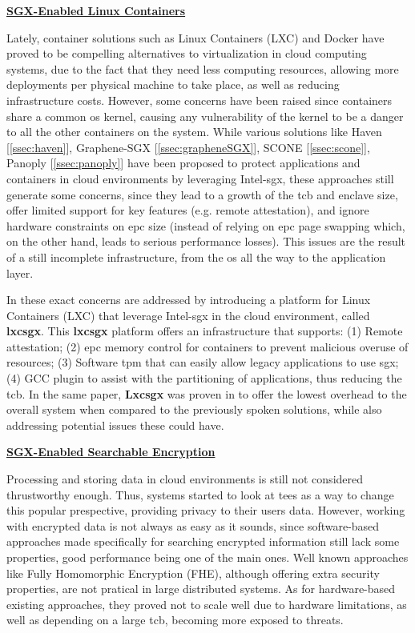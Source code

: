 \underline{\textbf{SGX-Enabled Linux Containers}}


Lately, container solutions such as Linux Containers (LXC) and Docker have proved to be compelling alternatives to virtualization in cloud computing systems, due to the fact that they need less computing resources, allowing more deployments per physical machine to take place, as well as reducing infrastructure costs. However, some concerns have been raised since containers share a common \gls{os} kernel, causing any vulnerability of the kernel to be a danger to all the other containers on the system.
While various solutions like Haven [\ref{ssec:haven}], Graphene-SGX [\ref{ssec:grapheneSGX}], SCONE [\ref{ssec:scone}], Panoply [\ref{ssec:panoply}] have been proposed to protect applications and containers in cloud environments by leveraging Intel-\gls{sgx}, these approaches still generate some concerns, since they lead to a growth of the \gls{tcb} and enclave size, offer limited support for key features (e.g. remote attestation), and ignore hardware constraints on \gls{epc} size (instead of relying on \gls{epc} page swapping which, on the other hand, leads to serious performance losses). 
This issues are the result of a still incomplete infrastructure, from the \gls{os} all the way to the application layer. 

In \cite{lxcsgxPaper} these exact concerns are addressed by introducing a platform for Linux Containers (LXC) that leverage Intel-\gls{sgx} in the cloud environment, called \textbf{lxcsgx}. 
This \textbf{lxcsgx} platform offers an infrastructure that supports: (1) Remote attestation; (2) \gls{epc} memory control for containers to prevent malicious overuse of resources; (3) Software \gls{tpm} that can easily allow legacy applications to use \gls{sgx}; (4) GCC plugin to assist with the partitioning of applications, thus reducing the \gls{tcb}.
In the same paper, \textbf{Lxcsgx} was proven in \cite{lxcsgxPaper} to offer the lowest overhead to the overall system when compared to the previously spoken solutions, while also addressing potential issues these could have.\newline


\underline{\textbf{SGX-Enabled Searchable Encryption}}


Processing and storing data in cloud environments is still not considered thrustworthy enough. Thus, systems started to look at \gls{tee}s as a way to change this popular prespective, providing privacy to their users data. 
However, working with encrypted data is not always as easy as it sounds, since software-based approaches made specifically for searching encrypted information still lack some properties, good performance being one of the main ones. Well known approaches like Fully Homomorphic Encryption (FHE), although offering extra security properties, are not pratical in large distributed systems. As for hardware-based existing approaches, they proved not to scale well due to hardware limitations, as well as depending on a large \gls{tcb}, becoming more exposed to threats.

